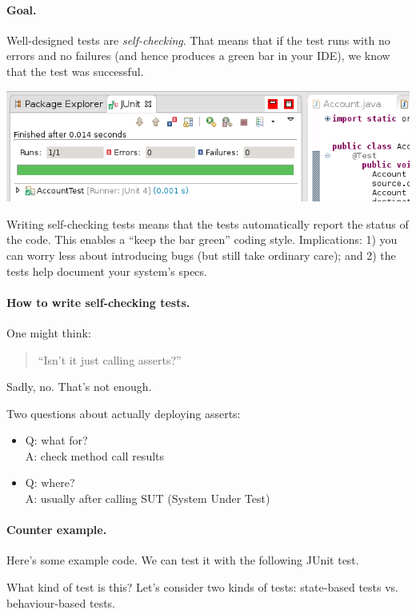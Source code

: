 \documentclass[11pt]{article}
\begin{document}
\paragraph{Goal.} Well-designed tests are \emph{self-checking}.
That means that if the test runs with no errors and no failures (and
hence produces a green bar in your IDE), we know that the test was
successful.

\begin{center}
    \includegraphics[width=.6\textwidth]{L02/pass}
\end{center}
  
Writing self-checking tests means that the tests automatically report
the status of the code. This enables a ``keep the bar green'' coding
style. Implications: 1) you can worry less about introducing bugs (but
still take ordinary care); and 2) the tests help document your
system's specs.

\paragraph{How to write self-checking tests.}
One might think:
\begin{quote}
  ``Isn't it just calling asserts?''
\end{quote}

Sadly, no. That's not enough.

Two questions about actually deploying asserts:
\begin{itemize}[noitemsep]
\item Q: what for?\\
  A: check method call results
\item Q: where?\\
  A: usually after calling SUT (System Under Test)
\end{itemize}

\paragraph{Counter example.} Here's some example code.
We can test it with the following JUnit test.

What kind of test is this? Let's consider two kinds of
tests: state-based tests vs. behaviour-based tests.
\end{document}
